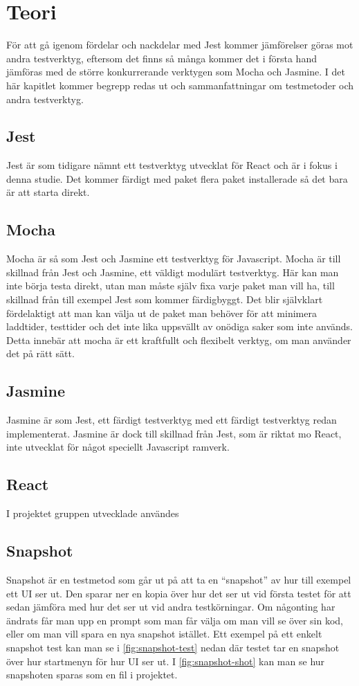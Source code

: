 \section{Teori}
\label{sec:david-theory}
För att gå igenom fördelar och nackdelar med Jest kommer jämförelser göras mot andra testverktyg, eftersom det finns så många kommer det i första hand jämföras med de större konkurrerande verktygen som Mocha och Jasmine. I det här kapitlet kommer begrepp redas ut och sammanfattningar om testmetoder och andra testverktyg.

\subsection{Jest}
Jest är som tidigare nämnt ett testverktyg utvecklat för React och är i fokus i denna studie. Det kommer färdigt med paket flera paket installerade så det bara är att starta direkt. 

\subsection{Mocha}
Mocha är så som Jest och Jasmine ett testverktyg för Javascript. Mocha är till skillnad från Jest och Jasmine, ett väldigt modulärt testverktyg. Här kan man inte börja testa direkt, utan man måste själv fixa varje paket man vill ha, till skillnad från till exempel Jest som kommer färdigbyggt. Det blir självklart fördelaktigt att man kan välja ut de paket man behöver för att minimera laddtider, testtider och det inte lika uppsvällt av onödiga saker som inte används. Detta innebär att mocha är ett kraftfullt och flexibelt verktyg, om man använder det på rätt sätt.

\subsection{Jasmine}
Jasmine är som Jest, ett färdigt testverktyg med ett färdigt testverktyg redan implementerat. Jasmine är dock till skillnad från Jest, som är riktat mo React, inte utvecklat för något speciellt Javascript ramverk.

\subsection{React}
I projektet gruppen utvecklade användes 

\subsection{Snapshot}
Snapshot är en testmetod som går ut på att ta en ``snapshot'' av hur till exempel ett UI ser ut. Den sparar ner en kopia över hur det ser ut vid första testet för att sedan jämföra med hur det ser ut vid andra testkörningar. Om någonting har ändrats får man upp en prompt som man får välja om man vill se över sin kod, eller om man vill spara en nya snapshot istället. Ett exempel på ett enkelt snapshot test kan man se i \ref{fig:snapshot-test} nedan där testet tar en snapshot över hur startmenyn för hur UI ser ut. I \ref{fig:snapshot-shot} kan man se hur snapshoten sparas som en fil i projektet.

